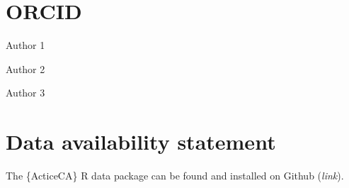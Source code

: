 \documentclass[Royal,times,sageh]{sagej}
\begin{document}
\section{ORCID}\label{orcid}

Author 1

Author 2

Author 3

\section{Data availability statement}\label{data-availability-statement}

The \{ActiceCA\} R data package can be found and installed on Github
(\emph{link}).



\end{document}
